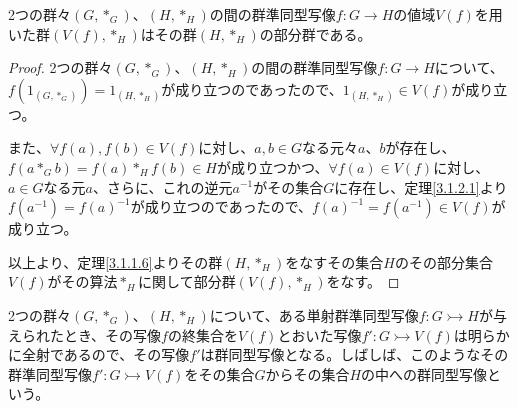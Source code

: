 \documentclass[dvipdfmx]{jsarticle}
\begin{document}
\begin{thm}\label{3.1.2.5}
2つの群々$\left( G,*_{G} \right)$、$\left( H,*_{H} \right)$の間の群準同型写像$f:G \rightarrow H$の値域$V(f)$を用いた群$\left( V(f),*_{H} \right)$はその群$\left( H,*_{H} \right)$の部分群である。
\end{thm}
\begin{proof}
2つの群々$\left( G,*_{G} \right)$、$\left( H,*_{H} \right)$の間の群準同型写像$f:G \rightarrow H$について、$f\left( 1_{\left( G,*_{G} \right)} \right) = 1_{\left( H,*_{H} \right)}$が成り立つのであったので、$1_{\left( H,*_{H} \right)} \in V(f)$が成り立つ。\par
また、$\forall f(a),f(b) \in V(f)$に対し、$a,b \in G$なる元々$a$、$b$が存在し、$f\left( a*_{G}b \right) = f(a)*_{H}f(b) \in H$が成り立つかつ、$\forall f(a) \in V(f)$に対し、$a \in G$なる元$a$、さらに、これの逆元$a^{- 1}$がその集合$G$に存在し、定理\ref{3.1.2.1}より$f\left( a^{- 1} \right) = {f(a)}^{- 1}$が成り立つのであったので、${f(a)}^{- 1} = f\left( a^{- 1} \right) \in V(f)$が成り立つ。\par
以上より、定理\ref{3.1.1.6}よりその群$\left( H,*_{H} \right)$をなすその集合$H$のその部分集合$V(f)$がその算法$*_{H}$に関して部分群$\left( V(f),*_{H} \right)$をなす。
\end{proof}
\begin{dfn}
2つの群々$\left( G,*_{G} \right)$、$\left( H,*_{H} \right)$について、ある単射群準同型写像$f:G \rightarrowtail H$が与えられたとき、その写像$f$の終集合を$V(f)$とおいた写像$f':G \rightarrowtail V(f)$は明らかに全射であるので、その写像$f'$は群同型写像となる。しばしば、このようなその群準同型写像$f':G \rightarrowtail V(f)$をその集合$G$からその集合$H$の中への群同型写像という。
\end{dfn}
\end{document}
